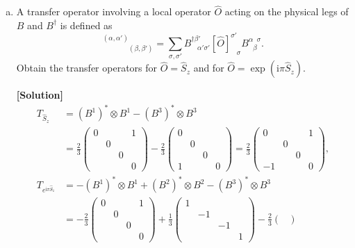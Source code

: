 \documentclass[11pt,a4paper,oneside]{article}
\begin{document}
\begin{enumerate}[(a)]
\item
A transfer operator involving a local operator $\hat{O}$ acting on the physical legs of $B$ and $B^\dagger$ is defined as
\begin{equation}
[T_{\hat{O}}]^{(\alpha, \alpha')}_{\phantom{(\alpha, \alpha')} (\beta, \beta')} 
= \sum_{\sigma, \sigma'} B^{\dagger \beta'}_{\phantom{\beta'} \alpha'  \sigma'}
[\hat{O}]^{\sigma'}_{\phantom{\sigma'} \sigma}
B^{\alpha \phantom{\beta} \sigma}_{\phantom{\alpha} \beta} .
\end{equation}
Obtain the transfer operators for $\hat{O} = \hat{S}_z$ and for $\hat{O} = \exp (\mathrm{i} \pi \hat{S}_z)$.

\textbf{[Solution]}
\begin{equation}
\begin{aligned}
T_{\hat{S}_z} &=
(B^1)^* \otimes B^1 -
(B^3)^* \otimes B^3
\\
&=
\frac{2}{3}
\begin{pmatrix}
0 & & & 1 \\
& 0 & & \\
& & 0 & \\
& & & 0
\end{pmatrix}
-
\frac{2}{3}
\begin{pmatrix}
0 & & & \\
& 0 & & \\
& & 0 & \\
1 & & & 0
\end{pmatrix}
=
\frac{2}{3}
\begin{pmatrix}
0 & & & 1 \\
& 0 & & \\
& & 0 & \\
-1 & & & 0
\end{pmatrix},
\\
T_{e^{\mathrm{i} \pi \hat{S}_z}} &=
- (B^1)^* \otimes B^1
+ (B^2)^* \otimes B^2 
- (B^3)^* \otimes B^3
\\
&=
- \frac{2}{3}
\begin{pmatrix}
0 & & & 1 \\
& 0 & & \\
& & 0 & \\
& & & 0
\end{pmatrix}
+
\frac{1}{3}
\begin{pmatrix}
1 & & & \\
& -1 & & \\
& & -1 & \\
& & & 1
\end{pmatrix}
-
\frac{2}{3}
\begin{pmatrix}

\end{pmatrix}
\end{aligned}
\end{equation}
\end{enumerate}
\end{document}
